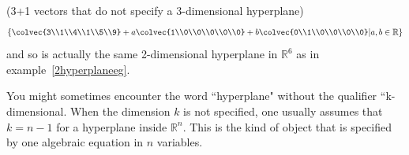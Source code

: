 \begin{example}{(3+1 vectors that do not specify a  3-dimensional hyperplane)}
\begin{gather*}
\left\{ \colvec{3\\1\\4\\1\\5\\9} + a\colvec{1\\0\\0\\0\\0\\0} + b\colvec{0\\1\\0\\0\\0\\0} \middle\arrowvert a,b \in \mathbb{R} \right\}\end{gather*} 
and so is actually the same 2-dimensional hyperplane in $\mathbb{R}^6$  as in example~\ref{2hyperplaneeg}.
\end{example}
















You might sometimes encounter the word ``hyperplane" without the qualifier ``k-dimensional. 
When the dimension $k$ is not specified, one usually assumes that $k=n-1$ for a hyperplane inside ${\mathbb R}^n$. This is the kind of object that is specified by one algebraic equation in $n$ variables. 

